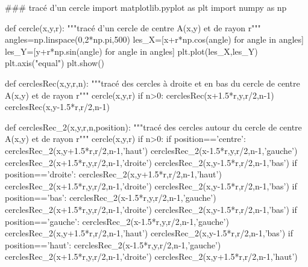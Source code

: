 \ifprof
\begin{corrige}
\begin{python}
### tracé d'un cercle
import matplotlib.pyplot as plt
import numpy as np

def cercle(x,y,r):
    """tracé d'un cercle de centre A(x,y) et de rayon r"""
    angles=np.linspace(0,2*np.pi,500)
    les_X=[x+r*np.cos(angle) for angle in angles]
    les_Y=[y+r*np.sin(angle) for angle in angles]
    plt.plot(les_X,les_Y)
    plt.axis("equal")
    plt.show()
    
def cerclesRec(x,y,r,n):
    """tracé des cercles à droite et en bas du cercle de centre A(x,y) et de rayon r"""
    cercle(x,y,r)
    if n>0:
        cerclesRec(x+1.5*r,y,r/2,n-1)
        cerclesRec(x,y-1.5*r,r/2,n-1)
        
def cerclesRec_2(x,y,r,n,position):
    """tracé des cercles autour du cercle de centre A(x,y) et de rayon r"""
    cercle(x,y,r)
    if n>0:
        if position=='centre':
            cerclesRec_2(x,y+1.5*r,r/2,n-1,'haut')
            cerclesRec_2(x-1.5*r,y,r/2,n-1,'gauche')
            cerclesRec_2(x+1.5*r,y,r/2,n-1,'droite')
            cerclesRec_2(x,y-1.5*r,r/2,n-1,'bas')
        if position=='droite':
            cerclesRec_2(x,y+1.5*r,r/2,n-1,'haut')
            cerclesRec_2(x+1.5*r,y,r/2,n-1,'droite')
            cerclesRec_2(x,y-1.5*r,r/2,n-1,'bas')
        if position=='bas':
            cerclesRec_2(x-1.5*r,y,r/2,n-1,'gauche')
            cerclesRec_2(x+1.5*r,y,r/2,n-1,'droite')
            cerclesRec_2(x,y-1.5*r,r/2,n-1,'bas')
        if position=='gauche':
            cerclesRec_2(x-1.5*r,y,r/2,n-1,'gauche')
            cerclesRec_2(x,y+1.5*r,r/2,n-1,'haut')
            cerclesRec_2(x,y-1.5*r,r/2,n-1,'bas')
        if position=='haut':
            cerclesRec_2(x-1.5*r,y,r/2,n-1,'gauche')
            cerclesRec_2(x+1.5*r,y,r/2,n-1,'droite')
            cerclesRec_2(x,y+1.5*r,r/2,n-1,'haut')
\end{python}
\end{corrige}
\else
\fi






